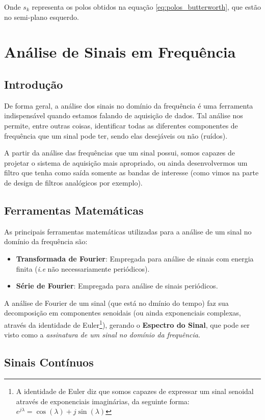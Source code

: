 \documentclass{article}
\begin{document}
    Onde $s_k$ representa os polos obtidos na equação \ref{eq:polos_butterworth}, que estão no semi-plano esquerdo.

\section{Análise de Sinais em Frequência}
\subsection{Introdução}
De forma geral, a análise dos sinais no domínio da frequência é uma ferramenta indispensável quando estamos falando de aquisição de dados. Tal análise nos permite, entre outras coisas, identificar todas as diferentes componentes de frequência que um sinal pode ter, sendo elas desejáveis ou não (ruídos). 

A partir da análise das frequências que um sinal possui, somos capazes de projetar o sistema de aquisição mais apropriado, ou ainda desenvolvermos um filtro que tenha como saída somente as bandas de interesse (como vimos na parte de design de filtros analógicos por exemplo).

\subsection{Ferramentas Matemáticas}
As principais ferramentas matemáticas utilizadas para a análise de um sinal no domínio da frequência são:
\begin{itemize}
    \item \textbf{Transformada de Fourier}: Empregada para análise de sinais com energia finita (\emph{i.e} não necessariamente periódicos).
    \item \textbf{Série de Fourier}: Empregada para análise de sinais periódicos.
\end{itemize}

A análise de Fourier de um sinal (que está no dmínio do tempo) faz sua decomposição em componentes senoidais (ou ainda exponenciais complexas, através da identidade de Euler\footnote{A identidade de Euler diz que somos capazes de expressar um sinal senoidal através de exponenciais imaginárias, da seguinte forma: $e^{j\lambda} = \cos{(\lambda)} + j \sin{(\lambda)}$}), gerando o \textbf{Espectro do Sinal}, que pode ser visto como a \emph{assinatura de um sinal no domínio da frequência}.

\subsection{Sinais Contínuos}
\end{document}
